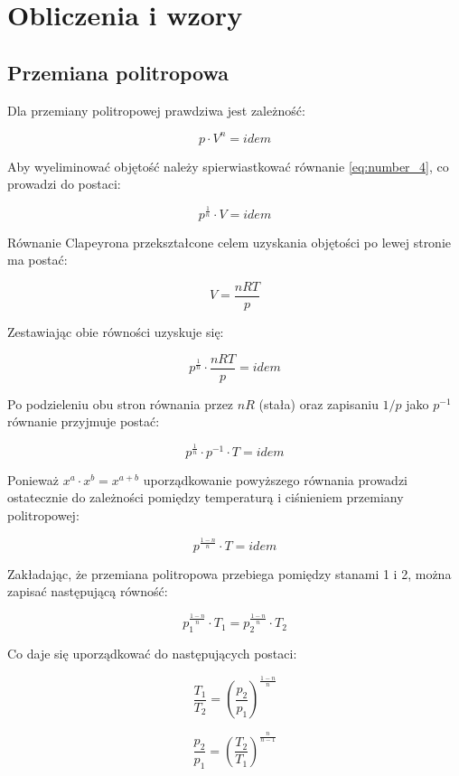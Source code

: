 \section{Obliczenia i wzory}

\subsection{Przemiana politropowa}
Dla przemiany politropowej prawdziwa jest zależność:

\begin{equation}
p \cdot V^n = idem
\label{eq:number_4}
\end{equation}

Aby wyeliminować objętość należy spierwiastkować równanie \eqref{eq:number_4}, co prowadzi do postaci:

\[p^{\frac {1}{n}} \cdot V = idem\]

Równanie Clapeyrona przekształcone celem uzyskania objętości po lewej stronie ma postać:

\[V = \frac{nRT} {p}\]

Zestawiając obie równości uzyskuje się:

\[p^{\frac {1}{n}} \cdot \frac{nRT} {p} = idem\]

Po podzieleniu obu stron równania przez $nR$ (stała) oraz zapisaniu $1/p$ jako $p^{-1}$ równanie przyjmuje postać:

\[p^{\frac {1}{n}} \cdot p^{-1} \cdot T = idem\]

Ponieważ $x^a \cdot x^b = x^{a+b}$ uporządkowanie powyższego równania prowadzi ostatecznie do zależności pomiędzy temperaturą i ciśnieniem przemiany politropowej:

\[p^{\frac {1-n}{n}} \cdot T = idem\]

Zakładając, że przemiana politropowa przebiega pomiędzy stanami 1 i 2, można zapisać następującą równość:

\[p_1 ^{\frac {1-n}{n}} \cdot T_1 = p_2 ^{\frac {1-n}{n}} \cdot T_2\]

Co daje się uporządkować do następujących postaci:

\begin{equation}
\frac{T_1}{T_2} =   \left( \frac {p_2}{p_1}\right) ^{\frac {1-n}{n}}
\label{eq:number_5}
\end{equation}

\begin{equation}
\frac{p_2}{p_1} =   \left( \frac {T_2}{T_1}\right) ^{\frac {n}{n-1}}
\label{eq:number_6}
\end{equation}


